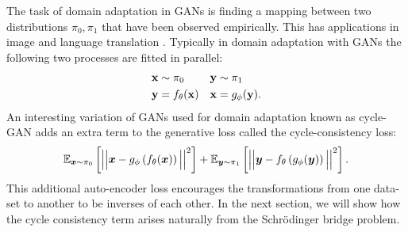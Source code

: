 \documentclass[a4paper,12pt,twoside,openright]{report}
\theoremstyle{definition}
\begin{document}
The task of domain adaptation in GANs is finding a mapping between two distributions $\pi_0, \pi_1$ that have been observed empirically. This has applications in image and language translation \citep{zhu2017unpaired,lample2017unsupervised}. Typically in domain adaptation with GANs the following two processes are fitted in parallel:
\begin{align*}
    {\mathbf{x}} &\sim \pi_0    &{\mathbf{y}} &\sim \pi_1\\
    {\mathbf{y}} &= f_{\theta}({\mathbf{x}})   &{\mathbf{x}} &= g_{\phi}({\mathbf{y}}).
\end{align*}
An interesting variation of GANs used for domain adaptation known as cycle-GAN adds an extra term to the generative loss called the cycle-consistency loss:
\begin{align*}
   \mathbb{E}_{{\bm{x}} \sim \pi_0}\left[ \Big|\Big|{\bm{x}}- g_\phi\left(f_\theta({\bm{x}}) \right) \Big|\Big|^2\right] +  \mathbb{E}_{{\bm{y}} \sim \pi_1}\left[ \Big|\Big|{\bm{y}}- f_\theta\left(g_\phi({\bm{y}}) \right) \Big|\Big|^2\right].
\end{align*}
This additional auto-encoder loss encourages the transformations from one data-set to another to be inverses of each other. In the next section, we will show how the cycle consistency term arises naturally from the Schrödinger bridge problem.
\end{document}
